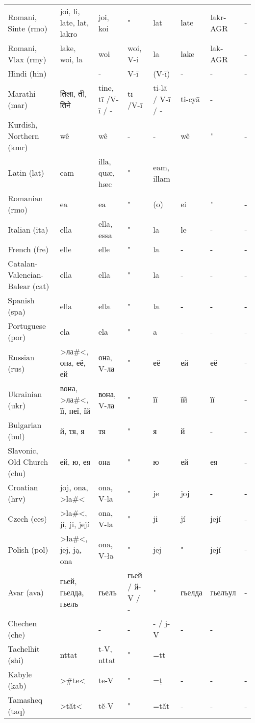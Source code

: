 \begin{landscape}
\begin{longtable}{*{8}{l}}
Romani, Sinte (rmo)	&	joi, li, late, lat, {lakro}	&	joi, koi	&	"	&	lat	&	late	&	lakr-AGR	&	 -	\\
Romani, Vlax (rmy)	&	lake, woi, la	&	woi	&	woi, V-i	&	la	&	lake	&	lak-AGR	&	 -	\\
Hindi (hin)	&		&	 -	&	V-ī	&	(V-ī)	&	 -	&	 -	&	 -	\\
Marathi (mar)	&	तिला, ती, तिने	&	tine, tī /V-ī / -	&	tī /V-ī	&	ti-lā / V-ī / -	&	ti-cyā	&	 -	&		\\
Kurdish, Northern (kmr)	&	wê	&	wê	&	 -	&	 -	&	wê	&	"	&	 -	\\
Latin (lat)	&	eam	&	illa, quæ, hæc	&	"	&	eam, illam	&	 -	&	 -	&	 -	\\
Romanian (rmo)	&	ea	&	ea	&	"	&	(o)	&	ei	&	"	&	 -	\\
Italian (ita)	&	ella	&	ella, essa	&	"	&	la	&	 le	&	 -	&	 -	\\
French (fre)	&	elle	&	elle	&	"	&	la	&	 -	&	 -	&	 -	\\
Catalan-Valencian-Balear (cat)	&	ella	&	ella	&	"	&	la	&	 -	&	 -	&	 -	\\
Spanish (spa)	&	ella	&	ella	&	"	&	la	&	 -	&	 -	&	 -	\\
Portuguese (por)	&	ela	&	ela	&	"	&	a	&	 -	&	 -	&	 -	\\
Russian (rus)	&	>ла\#<, она, её, ей	&	она, V-ла	&	"	&	её	&	ей	&	её	&	 -	\\
Ukrainian (ukr)	&	вона, >ла\#<, її, неї, {їй}	&	вона, V-ла	&	"	&	її	&	їй	&	її 	&	 -	\\
Bulgarian (bul)	&	й, тя, я	&	тя 	&	"	&	я 	&	й	&	 -	&	 -	\\
Slavonic, Old Church (chu)	&	ей, ю, ея	&	она	&	"	&	ю 	&	ей	&	ея	&	 -	\\
Croatian (hrv)	&	joj, ona, {>la\#<}	&	ona, V-la	&	"	&	je	&	joj	&	 -	&	 -	\\
Czech (ces)	&	>la\#<, jí, {ji, její}	&	ona, V-la	&	"	&	ji	&	jí	&	její	&	 -	\\
Polish (pol)	&	>ła\#<, jej, ją, {ona}	&	ona, V-ła	&	"	&	jej	&	"	&	její	&	 -	\\
Avar (ava)	&	гьей, гьелда, гьелъ	&	гьелъ	&	гьей / й-V / -	&	"	&	гьелда 	&	гьелъул 	&	 -	\\
Chechen (che)	&		&	 -	&	 -	&	 - / j-V	&	 -	&	 -	&		\\
Tachelhit (shi)	&	nttat	&	t-V, nttat	&	"	&	 =tt	&	 -	&	 -	&	 -	\\
Kabyle (kab)	&	{>\#te<}	&	te-V	&	"	&	 =ț	&	 -	&	 -	&	 -	\\
Tamasheq (taq)	&	>tăt<	&	tĕ-V	&	"	&	 =tăt 	&	 -	&	 -	&	 -	\\

\end{longtable}
\end{landscape}
